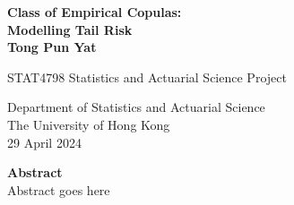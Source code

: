 \documentclass[12pt]{report}
\newcommand{\1}{\mathbf{1}}
\begin{document}
\begin{titlepage}
   \begin{center}
       \vspace*{1cm}
        \huge
       \textbf{Class of Empirical Copulas:} \\
       \huge
       \textbf{Modelling Tail Risk} \\
       \vspace{2cm}
        \LARGE
       \textbf{Tong Pun Yat}

       
        
       \vspace{7.0cm}
       \Large
       STAT4798 Statistics and Actuarial Science Project
            
       \vspace{0.8cm}
            
       Department of Statistics and Actuarial Science\\
       The University of Hong Kong\\
       29 April 2024
            
   \end{center}

\end{titlepage}

\newpage
\begin{flushleft}
\LARGE
\textbf{Abstract} \\
\normalsize
\vspace{1cm}
Abstract goes here
\end{flushleft}


\tableofcontents
\renewcommand\thesection{\arabic{section}}
\end{document}

